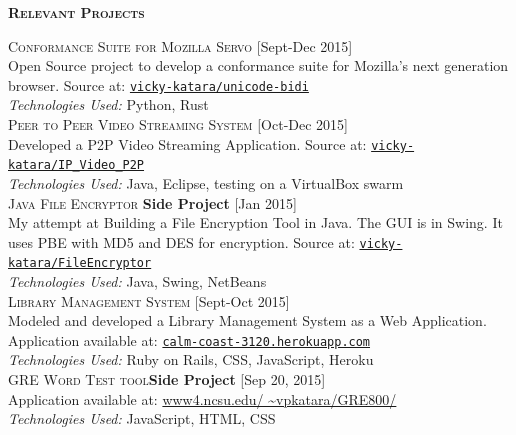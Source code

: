 \documentclass[letterpaper,12pt,final]{memoir}
\newcommand{\SmallSep}{\vspace{0.5em}}
\newcommand{\CVSection}[1]
	{\Large\textbf{\textsc{{#1}}}\par
	\SmallSep\normalsize\normalfont}
\newcommand{\CVItem}[1]
	{\textsc{\color{Plum} #1}}
\newcommand{\plumBox}[1]
{\space\space\colorbox{Plum!10}{\tiny \textbf{{#1}}}}
\newcommand{\RightAlignedInlineText}[1]
{{\footnotesize \color{Plum}  \hfill [#1]}}
\begin{document}
\CVSection{Relevant Projects}
\CVItem{Conformance Suite for Mozilla Servo} \RightAlignedInlineText{Sept-Dec 2015}\\
{\footnotesize Open Source project to develop a conformance suite for Mozilla's next generation browser. Source at: \color{Plum} \href{https://github.com/vicky-katara/unicode-bidi}{\space\space\texttt{vicky-katara/unicode-bidi}} \\\color{Black}
	\emph{Technologies Used:} Python, Rust}%
\SmallSep\\
\CVItem{Peer to Peer Video Streaming System} \RightAlignedInlineText{Oct-Dec 2015}\\
{\footnotesize Developed a P2P Video Streaming Application. Source at: \color{Plum} \href{https://github.com/vicky-katara/IP_Video_P2P.git}{\space\space\texttt{vicky-katara/IP\_Video\_P2P}} \\\color{Black}
	\emph{Technologies Used:} Java, Eclipse, testing on a VirtualBox swarm}%
\SmallSep\\
\CVItem{Java File Encryptor} \plumBox{Side Project} \RightAlignedInlineText{Jan 2015}\\
{\footnotesize My attempt at Building a File Encryption Tool in Java. The GUI is in Swing. It uses PBE with MD5 and DES for encryption. Source at: \color{Plum} \href{https://github.com/vicky-katara/FileEncryptor.git}{\space\space\texttt{vicky-katara/FileEncryptor}} \\\color{Black}
	\emph{Technologies Used:} Java, Swing, NetBeans}%
\SmallSep\\
\CVItem{Library Management System}\RightAlignedInlineText{Sept-Oct 2015}\\
{\footnotesize Modeled and developed a Library Management System as a Web Application. \\Application available at: \color{Plum} \href{https://calm-coast-3120.herokuapp.com/}{\space\space\texttt{calm-coast-3120.herokuapp.com}} \\\color{Black}
	\emph{Technologies Used:} Ruby on Rails, CSS, JavaScript, Heroku}%
\SmallSep\\
\CVItem{GRE Word Test tool}\plumBox{Side Project} \RightAlignedInlineText{Sep 20, 2015}\\
{\footnotesize Application available at: \color{Plum} \href{http://www4.ncsu.edu/~vpkatara/GRE800/}{\space\space\url{www4.ncsu.edu/ ~vpkatara/GRE800/}} \\\color{Black}
	\emph{Technologies Used:} JavaScript, HTML, CSS}%
\end{document}
